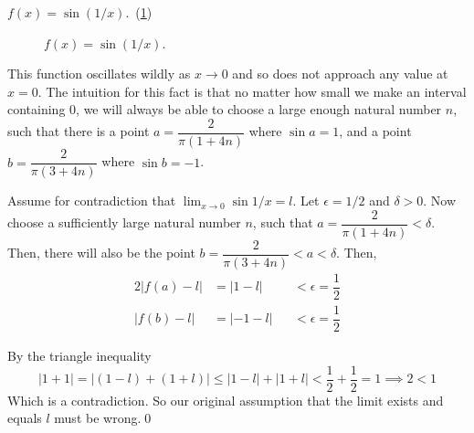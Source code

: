 \documentclass[10pt]{book}
\newcommand{\newthought}[1]{\vspace{0.5\baselineskip}\noindent{\scshape #1}}
\begin{document}
\newthought{Consider} $f(x)=\sin(1/x)$.\ (\cref{fig:sin1x})
\begin{figure}[H]
  \centering
  \caption{$f(x)=\sin(1/x)$.}
  \label{fig:sin1x}
\end{figure}
This function oscillates wildly as $x \to 0$ and so does not approach any value at $x=0$. The intuition for
this fact is that no
matter how small we make an
interval containing $0$, we will always be able to choose a large enough natural number $n$, such that there is a point
$a=\dfrac{2}{\pi(1+4n)}$ where $\sin{a}=1$, and
a point $b=\dfrac{2}{\pi(3+4n)}$ where $\sin{b}=-1$.

Assume for contradiction that $\lim_{x \to 0}\sin{1/x}=l$. Let $\epsilon=1/2$ and $\delta > 0$. Now choose a
sufficiently large
natural number $n$, such that
$a=\dfrac{2}{\pi(1+4n)}< \delta$. Then, there will also be the point $b=\dfrac{2}{\pi(3+4n)} < a < \delta$. Then,
\begin{alignat*}{2}
  |f(a)-l| & = |1-l|   &  & < \epsilon = \dfrac{1}{2} \\
  |f(b)-l| & = | -1-l| &  & < \epsilon = \dfrac{1}{2}
\end{alignat*}

By the triangle inequality
\[
  |1+1| = |(1-l)+(1+l)| \le |1-l| + |1+l| < \dfrac{1}{2} + \dfrac{1}{2} = 1 \implies 2 < 1
\]
Which is a contradiction. So our original assumption that the limit exists and equals $l$ must be wrong.\qed\
\end{document}
